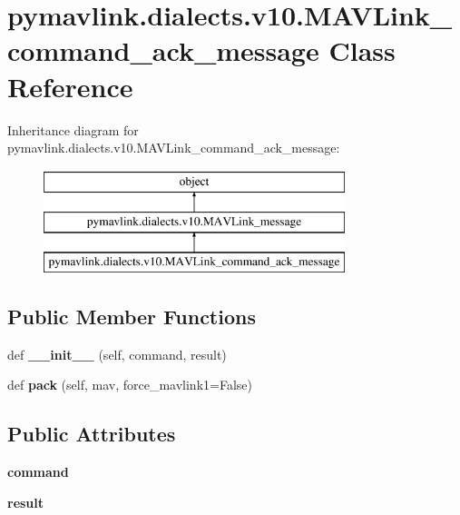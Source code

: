 \hypertarget{classpymavlink_1_1dialects_1_1v10_1_1MAVLink__command__ack__message}{}\section{pymavlink.\+dialects.\+v10.\+M\+A\+V\+Link\+\_\+command\+\_\+ack\+\_\+message Class Reference}
\label{classpymavlink_1_1dialects_1_1v10_1_1MAVLink__command__ack__message}
Inheritance diagram for pymavlink.\+dialects.\+v10.\+M\+A\+V\+Link\+\_\+command\+\_\+ack\+\_\+message\+:\begin{figure}[H]
\begin{center}
\leavevmode
\includegraphics[height=3.000000cm]{classpymavlink_1_1dialects_1_1v10_1_1MAVLink__command__ack__message}
\end{center}
\end{figure}
\subsection*{Public Member Functions}
\begin{DoxyCompactItemize}
\item 
\mbox{\label{classpymavlink_1_1dialects_1_1v10_1_1MAVLink__command__ack__message_a1279dc20e4c7ffa67a4a9f7c51dca5f3}} 
def {\bfseries \+\_\+\+\_\+init\+\_\+\+\_\+} (self, command, result)
\item 
\mbox{\label{classpymavlink_1_1dialects_1_1v10_1_1MAVLink__command__ack__message_a021307b2f2fd5526d66cdae83e3df416}} 
def {\bfseries pack} (self, mav, force\+\_\+mavlink1=False)
\end{DoxyCompactItemize}
\subsection*{Public Attributes}
\begin{DoxyCompactItemize}
\item 
\mbox{\label{classpymavlink_1_1dialects_1_1v10_1_1MAVLink__command__ack__message_a2e0c713abf4bbfdf90a30f14877d568b}} 
{\bfseries command}
\item 
\mbox{\label{classpymavlink_1_1dialects_1_1v10_1_1MAVLink__command__ack__message_a7c5fefbaf533531749a0b1a0ad49c105}} 
{\bfseries result}
\end{DoxyCompactItemize}
